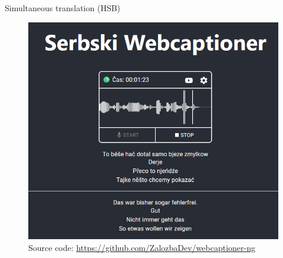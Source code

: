   \begin{block}{Simultaneous translation (HSB)}


    \begin{figure}
        \centering
        \includegraphics[width=0.7\colwidth]{03_z_01_webcaptioner_klein.png}
        \caption{Source code: \url{https://github.com/ZalozbaDev/webcaptioner-ng}}
        \label{fig:webcaptioner}
    \end{figure}

  \end{block}
